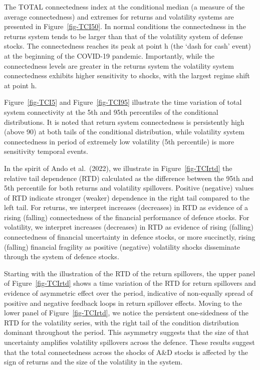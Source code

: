 \documentclass[
  letterpaper,
  DIV=11,
  numbers=noendperiod]{scrartcl}
\begin{document}
The TOTAL connectedness index at the conditional median (a measure of
the average connectedness) and extremes for returns and volatility
systems are presented in Figure~\ref{fig-TCI50}. In normal conditions
the connectedness in the returns system tends to be larger than that of
the volatility system of defense stocks. The connectedness reaches its
peak at point h (the `dash for cash' event) at the beginning of the
COVID-19 pandemic. Importantly, while the connectedness levels are
greater in the returns system the volatility system connectedness
exhibits higher sensitivity to shocks, with the largest regime shift at
point h.

Figure~\ref{fig-TCI5} and Figure~\ref{fig-TCI95} illustrate the time
variation of total system connectivity at the 5th and 95th percentiles
of the conditional distributions. It is noted that return system
connectedness is persistently high (above 90) at both tails of the
conditional distribution, while volatility system connectedness in
period of extremely low volatility (5th percentile) is more sensitivity
temporal events.

In the spirit of Ando et al.~(2022), we illustrate in
Figure~\ref{fig-TCIrtd} the relative tail dependence (RTD) calculated as
the difference between the 95th and 5th percentile for both returns and
volatility spillovers. Positive (negative) values of RTD indicate
stronger (weaker) dependence in the right tail compared to the left
tail. For returns, we interpret increases (decreases) in RTD as evidence
of a rising (falling) connectedness of the financial performance of
defence stocks. For volatility, we interpret increases (decreases) in
RTD as evidence of rising (falling) connectedness of financial
uncertainty in defence stocks, or more succinctly, rising (falling)
financial fragility as positive (negative) volatility shocks disseminate
through the system of defence stocks.

Starting with the illustration of the RTD of the return spillovers, the
upper panel of Figure~\ref{fig-TCIrtd} shows a time variation of the RTD
for return spillovers and evidence of asymmetric effect over the period,
indicative of non-equally spread of positive and negative feedback loops
in return spillover effects. Moving to the lower panel of
Figure~\ref{fig-TCIrtd}, we notice the persistent one-sidedness of the
RTD for the volatility series, with the right tail of the condition
distribution dominant throughout the period. This asymmetry suggests
that the size of that uncertainty amplifies volatility spillovers across
the defence. These results suggest that the total connectedness across
the shocks of A\&D stocks is affected by the sign of returns and the
size of the volatility in the system.
\end{document}
